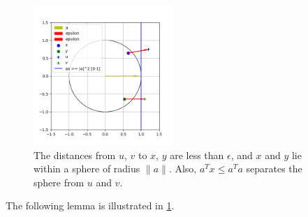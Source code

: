 \begin{figure}[ht]
	\centering
	\includegraphics[width=200px]{images/spokes.png}
	\caption[A depiction of the quantities within \cref{properties_of_a_circle}.]{ %
			The distances from $u$, $v$ to $x$, $y$ are less than $\epsilon$, and $x$ and $y$ lie within a sphere of radius $\|a\|$.
			Also, $a^Tx \le a^Ta$ separates the sphere from $u$ and $v$.
	}
	\label{first_lemma}
\end{figure}
The following lemma is illustrated in \cref{first_lemma}.
